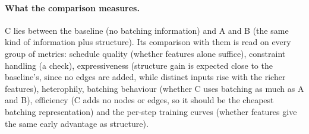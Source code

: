 \documentclass[11pt,a4paper]{article}
\begin{document}
\paragraph{What the comparison measures.} C lies between the baseline (no batching
information) and A and B (the same kind of information plus structure). Its comparison with
them is read on every group of metrics: schedule quality (whether features alone suffice),
constraint handling (a check), expressiveness (structure gain is expected close to the
baseline's, since no edges are added, while distinct inputs rise with the richer features),
heterophily, batching behaviour (whether C uses batching as much as A and B), efficiency (C
adds no nodes or edges, so it should be the cheapest batching representation) and the
per-step training curves (whether features give the same early advantage as structure).
\end{document}
